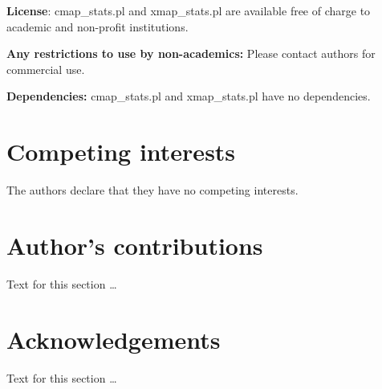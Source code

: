 \documentclass{bmcart}
\begin{document}
\textbf{License}: cmap\_stats.pl and xmap\_stats.pl are available free of charge to academic and non-profit institutions.

\textbf{Any restrictions to use by non-academics:} Please contact authors for commercial use.

\textbf{Dependencies:} cmap\_stats.pl and xmap\_stats.pl have no dependencies.


\begin{backmatter}

\section*{Competing interests}
  The authors declare that they have no competing interests.

\section*{Author's contributions}
    Text for this section \ldots

\section*{Acknowledgements}
  Text for this section \ldots



\end{backmatter}
\end{document}
